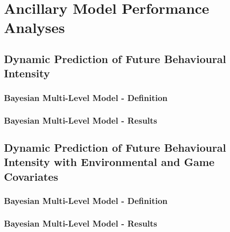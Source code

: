 \chapter{Ancillary Model Performance Analyses}

\section{Dynamic Prediction of Future Behavioural Intensity}
\label{dynamic_prediction_ancillary_perf}

\subsection{Bayesian Multi-Level Model - Definition}


\subsection{Bayesian Multi-Level Model - Results}

\section{Dynamic Prediction of Future Behavioural Intensity with Environmental and Game Covariates}
\label{dynamic_env_even_prediction_ancillary_perf}

\subsection{Bayesian Multi-Level Model - Definition}


\subsection{Bayesian Multi-Level Model - Results}
